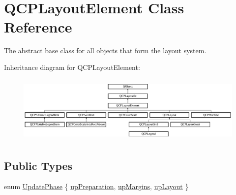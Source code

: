 \hypertarget{class_q_c_p_layout_element}{}\section{Q\+C\+P\+Layout\+Element Class Reference}
\label{class_q_c_p_layout_element}


The abstract base class for all objects that form the layout system.  


Inheritance diagram for Q\+C\+P\+Layout\+Element\+:\begin{figure}[H]
\begin{center}
\leavevmode
\includegraphics[height=3.376884cm]{class_q_c_p_layout_element}
\end{center}
\end{figure}
\subsection*{Public Types}
\begin{DoxyCompactItemize}
\item 
enum \mbox{\hyperlink{class_q_c_p_layout_element_a0d83360e05735735aaf6d7983c56374d}{Update\+Phase}} \{ \mbox{\hyperlink{class_q_c_p_layout_element_a0d83360e05735735aaf6d7983c56374dad6119882eba136357c2f627992e527d3}{up\+Preparation}}, 
\mbox{\hyperlink{class_q_c_p_layout_element_a0d83360e05735735aaf6d7983c56374da288cb59a92280e47261a341f2813e676}{up\+Margins}}, 
\mbox{\hyperlink{class_q_c_p_layout_element_a0d83360e05735735aaf6d7983c56374da5d1ccf5d79967c232c3c511796860045}{up\+Layout}}
 \}
\end{DoxyCompactItemize}
